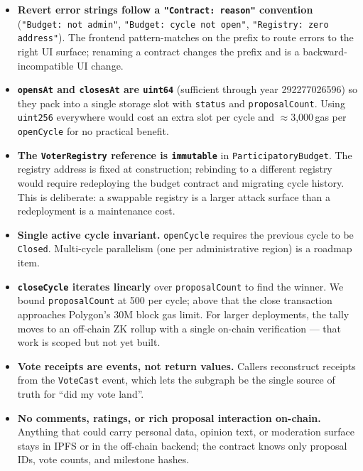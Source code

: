 \documentclass[12pt]{article}
\begin{document}
\begin{itemize}
  \item \textbf{Revert error strings follow a \texttt{"Contract: reason"}
        convention} (\texttt{"Budget: not admin"},
        \texttt{"Budget: cycle not open"}, \texttt{"Registry: zero
        address"}). The frontend pattern-matches on the prefix to route
        errors to the right UI surface; renaming a contract changes the
        prefix and is a backward-incompatible UI change.
  \item \textbf{\texttt{opensAt} and \texttt{closesAt} are
        \texttt{uint64}} (sufficient through year 292277026596) so they
        pack into a single storage slot with \texttt{status} and
        \texttt{proposalCount}. Using \texttt{uint256} everywhere would
        cost an extra slot per cycle and \(\approx\)3{,}000\,gas per
        \texttt{openCycle} for no practical benefit.
  \item \textbf{The \texttt{VoterRegistry} reference is
        \texttt{immutable}} in \texttt{ParticipatoryBudget}. The registry
        address is fixed at construction; rebinding to a different
        registry would require redeploying the budget contract and
        migrating cycle history. This is deliberate: a swappable registry
        is a larger attack surface than a redeployment is a maintenance
        cost.
  \item \textbf{Single active cycle invariant.} \texttt{openCycle}
        requires the previous cycle to be \texttt{Closed}. Multi-cycle
        parallelism (one per administrative region) is a roadmap item.
  \item \textbf{\texttt{closeCycle} iterates linearly} over
        \texttt{proposalCount} to find the winner. We bound
        \texttt{proposalCount} at 500 per cycle; above that the close
        transaction approaches Polygon's 30M block gas limit. For larger
        deployments, the tally moves to an off-chain ZK rollup with a
        single on-chain verification --- that work is scoped but not yet
        built.
  \item \textbf{Vote receipts are events, not return values.} Callers
        reconstruct receipts from the \texttt{VoteCast} event, which lets
        the subgraph be the single source of truth for ``did my vote land''.
  \item \textbf{No comments, ratings, or rich proposal interaction on-chain.}
        Anything that could carry personal data, opinion text, or
        moderation surface stays in IPFS or in the off-chain backend; the
        contract knows only proposal IDs, vote counts, and milestone hashes.
\end{itemize}
\end{document}
